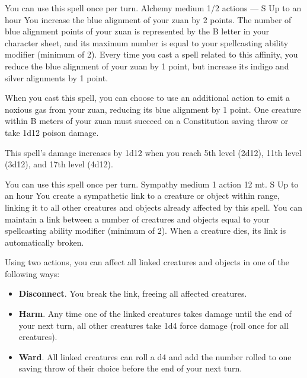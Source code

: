     You can use this spell once per turn.
    {Alchemy medium}
    {1/2 actions}
    {---}
    {S}
    {Up to an hour}
    You increase the blue alignment of your zuan by 2 points.
    The number of blue alignment points of your zuan is represented by the B letter in your character sheet, and its maximum number is equal to your spellcasting ability modifier (minimum of 2).
    Every time you cast a spell related to this affinity, you reduce the blue alignment of your zuan by 1 point, but increase its indigo and silver alignments by 1 point.

    When you cast this spell, you can choose to use an additional action to emit a noxious gas from your zuan, reducing its blue alignment by 1 point.
    One creature within B meters of your zuan must succeed on a Constitution saving throw or take 1d12 poison damage.

    This spell's damage increases by 1d12 when you reach 5th level (2d12), 11th level (3d12), and 17th level (4d12).

    You can use this spell once per turn.
    {Sympathy medium}
    {1 action}
    {12 mt.}
    {S}
    {Up to an hour}
    You create a sympathetic link to a creature or object within range, linking it to all other creatures and objects already affected by this spell.
    You can maintain a link between a number of creatures and objects equal to your spellcasting ability modifier (minimum of 2).
    When a creature dies, its link is automatically broken.

    Using two actions, you can affect all linked creatures and objects in one of the following ways:
    \begin{itemize}
        \item \textbf{Disconnect}.
        You break the link, freeing all affected creatures.
        \item \textbf{Harm}.
        Any time one of the linked creatures takes damage until the end of your next turn, all other creatures take 1d4 force damage (roll once for all creatures).
        \item \textbf{Ward}.
        All linked creatures can roll a d4 and add the number rolled to one saving throw of their choice before the end of your next turn.
    \end{itemize}

\newpage~\newpage
